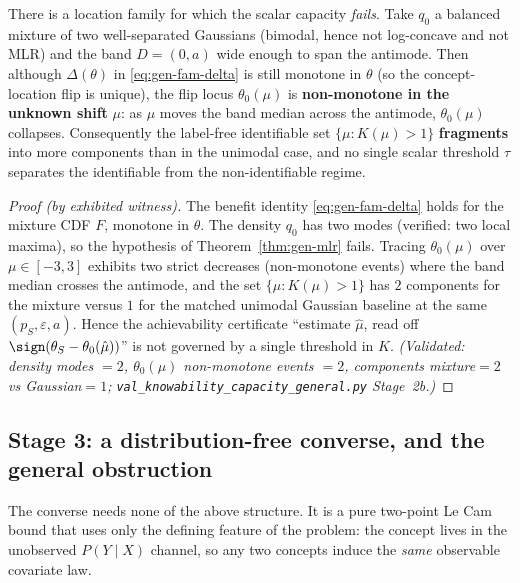 \begin{theorem}\label{thm:gen-breaker}
There is a location family for which the scalar capacity \emph{fails}. Take $q_0$ a
balanced mixture of two well-separated Gaussians (bimodal, hence not log-concave and
not MLR) and the band $D=(0,a)$ wide enough to span the antimode. Then although
$\Delta(\theta)$ in \eqref{eq:gen-fam-delta} is still monotone in $\theta$ (so the
concept-location flip is unique), the flip locus $\theta_0(\mu)$ is \textbf{non-monotone
in the unknown shift} $\mu$: as $\mu$ moves the band median across the antimode,
$\theta_0(\mu)$ collapses. Consequently the label-free identifiable set
$\{\mu:K(\mu)>1\}$ \textbf{fragments} into more components than in the unimodal case, and
no single scalar threshold $\tau$ separates the identifiable from the
non-identifiable regime.
\end{theorem}
\begin{proof}[Proof (by exhibited witness)]
The benefit identity \eqref{eq:gen-fam-delta} holds for the mixture CDF $F$, monotone
in $\theta$. The density $q_0$ has two modes (verified: two local maxima), so the
hypothesis of Theorem~\ref{thm:gen-mlr} fails. Tracing $\theta_0(\mu)$ over
$\mu\in[-3,3]$ exhibits two strict decreases (non-monotone events) where the band
median crosses the antimode, and the set $\{\mu:K(\mu)>1\}$ has $2$ components for the
mixture versus $1$ for the matched unimodal Gaussian baseline at the same
$(p_S,\varepsilon,a)$. Hence the achievability certificate ``estimate $\hat\mu$, read
off $\sign(\theta_S-\theta_0(\hat\mu))$'' is not governed by a single threshold in $K$.
\emph{(Validated: density modes $=2$, $\theta_0(\mu)$ non-monotone events $=2$,
components mixture$=2$ vs Gaussian$=1$; \texttt{val\_knowability\_capacity\_general.py}
Stage~2b.)}
\end{proof}

\subsection{Stage 3: a distribution-free converse, and the general obstruction}
\label{sec:gen-df}
The converse needs none of the above structure. It is a pure two-point Le Cam bound
that uses only the defining feature of the problem: the concept lives in the
unobserved $P(Y\mid X)$ channel, so any two concepts induce the \emph{same} observable
covariate law.

